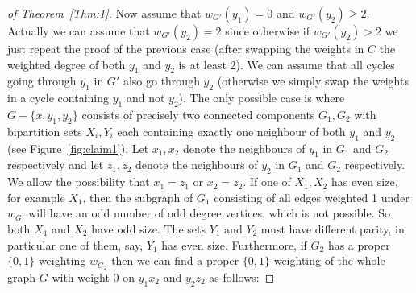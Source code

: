 \documentclass[
final,
 nomarks,
]{dmtcs-episciences}
\theoremstyle{definition}
\begin{document}
\begin{proof}[of Theorem~\ref{Thm:1}]
Now assume that $w_{G'}(y_1)=0$ and $w_{G'}(y_2) \geq 2$. Actually we can assume that $w_{G'}(y_2) = 2$ since otherwise if $w_{G'}(y_2) > 2$ we just repeat the proof of the previous case (after swapping the weights in $C$ the weighted degree of both $y_1$ and $y_2$ is at least 2). We can assume that all cycles going through $y_1$ in $G'$ also go through $y_2$ (otherwise we simply swap the weights in a cycle containing $y_1$ and not $y_2$). The only possible case is where $G-\{x,y_1,y_2\}$ consists of precisely two connected components $G_1, G_2$ with bipartition sets $X_i, Y_i$ each containing exactly one neighbour of both $y_1$ and $y_2$ (see Figure~\ref{fig:claim1}). Let $x_1,x_2$ denote the neighbours of $y_1$ in $G_1$ and $G_2$ respectively and let $z_1,z_2$ denote the neighbours of $y_2$ in $G_1$ and $G_2$ respectively. We allow the possibility that $x_1=z_1$ or $x_2=z_2$. If one of $X_1, X_2$ has even size, for example $X_1$, then the subgraph of $G_1$ consisting of all edges weighted 1 under $w_{G'}$ will have an odd number of odd degree vertices, which is not possible. So both  $X_1$ and  $X_2$ have odd size. The sets $Y_1$ and $Y_2$ must have different parity, in particular one of them, say, $Y_1$ has even size. Furthermore, if $G_2$ has a proper $\{0,1\}$-weighting $w_{G_2}$ then we can find a proper $\{0,1\}$-weighting of the whole graph $G$ with weight 0 on $y_1x_2$ and $y_2z_2$ as follows:  

\end{proof}
\end{document}
